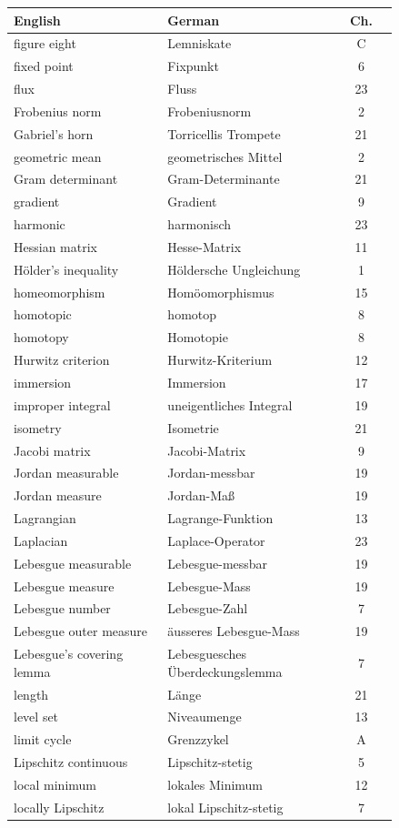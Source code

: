 \begin{center}
\begin{tabular}{@{}p{0.40\linewidth} p{0.44\linewidth} c@{}}
\textbf{English} & \textbf{German} & \textbf{Ch.} \\
\hline
figure eight & Lemniskate & C \\
fixed point & Fixpunkt & 6 \\
flux & Fluss & 23 \\
Frobenius norm & Frobeniusnorm & 2 \\
Gabriel's horn & Torricellis Trompete & 21 \\
geometric mean & geometrisches Mittel & 2 \\
Gram determinant & Gram-Determinante & 21 \\
gradient & Gradient & 9 \\
harmonic & harmonisch & 23 \\
Hessian matrix & Hesse-Matrix & 11 \\
Hölder's inequality & Höldersche Ungleichung & 1 \\
homeomorphism & Homöomorphismus & 15 \\
homotopic & homotop & 8 \\
homotopy & Homotopie & 8 \\
Hurwitz criterion & Hurwitz-Kriterium & 12 \\
immersion & Immersion & 17 \\
improper integral & uneigentliches Integral & 19 \\
isometry & Isometrie & 21 \\
Jacobi matrix & Jacobi-Matrix & 9 \\
Jordan measurable & Jordan-messbar & 19 \\
Jordan measure & Jordan-Maß & 19 \\
Lagrangian & Lagrange-Funktion & 13 \\
Laplacian & Laplace-Operator & 23 \\
Lebesgue measurable & Lebesgue-messbar & 19 \\
Lebesgue measure & Lebesgue-Mass & 19 \\
Lebesgue number & Lebesgue-Zahl & 7 \\
Lebesgue outer measure & äusseres Lebesgue-Mass & 19 \\
Lebesgue's covering lemma & Lebesguesches Überdeckungslemma & 7 \\
length & Länge & 21 \\
level set & Niveaumenge & 13 \\
limit cycle & Grenzzykel & A \\
Lipschitz continuous & Lipschitz-stetig & 5 \\
local minimum & lokales Minimum & 12 \\
locally Lipschitz & lokal Lipschitz-stetig & 7 \\
\end{tabular}
\end{center}

